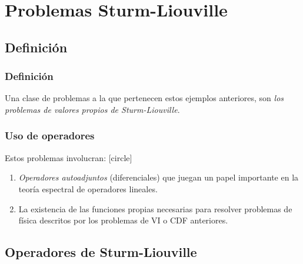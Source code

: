 \documentclass[12pt]{beamer}
\begin{document}
\section{Problemas Sturm-Liouville}
\subsection{Definición}

\begin{frame}
\frametitle{Definición}
Una clase de problemas a la que pertenecen estos ejemplos anteriores, son \emph{los problemas de valores propios de Sturm-Liouville}.
\end{frame}
\begin{frame}
\frametitle{Uso de operadores}
Estos problemas involucran:
[circle]
\begin{enumerate}[<+->]
\item \emph{Operadores autoadjuntos} (diferenciales) que juegan un papel importante en la teoría espectral de operadores lineales.
\item La existencia de las funciones propias necesarias para resolver problemas de física descritos por los problemas de VI o CDF anteriores.
\end{enumerate}
\end{frame}

\subsection{Operadores de Sturm-Liouville}
\end{document}
